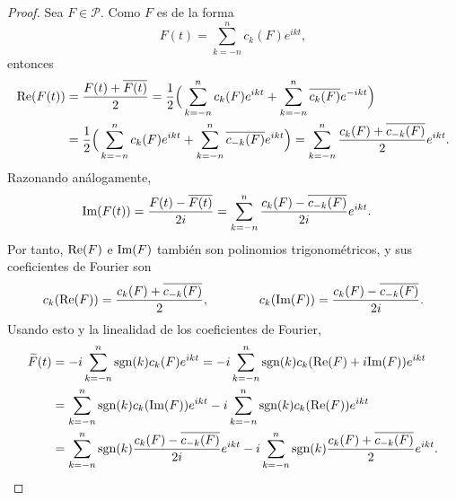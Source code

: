 \documentclass[a4paper, 12pt, oneside]{book}
\begin{document}
\begin{proof}
    Sea $F \in \mathcal{P}$. Como $F$ es de la forma
    \[F(t) = \sum_{k=-n}^n c_k(F)e^{ikt},\]
    entonces
    \begin{align*}
        \textup{Re}(F(t)) &= \frac{F(t)+\overline{F(t)}}{2} = \frac{1}{2}\Bigl(\,\sum_{k=-n}^n c_k(F)e^{ikt}+\sum_{k=-n}^n\overline{c_k(F)}e^{-ikt}\Bigr) \\
        &= \frac{1}{2}\Bigl(\,\sum_{k=-n}^n c_k(F)e^{ikt}+\sum_{k=-n}^n\overline{c_{-k}(F)}e^{ikt}\Bigr) = \sum_{k=-n}^n \frac{c_k(F)+\overline{c_{-k}(F)}}{2}e^{ikt}.
    \end{align*}
    Razonando análogamente,
    \begin{align*}
        \textup{Im}(F(t)) &= \frac{F(t)-\overline{F(t)}}{2i} = \sum_{k=-n}^n \frac{c_k(F)-\overline{c_{-k}(F)}}{2i}e^{ikt}.
    \end{align*}
    Por tanto, $\textup{Re}(F)$ e $\textup{Im}(F)$ también son polinomios trigonométricos, y sus coeficientes de Fourier son
    \[c_k(\textup{Re}(F)) = \frac{c_k(F)+\overline{c_{-k}(F)}}{2}, \qquad \qquad c_k(\textup{Im}(F)) = \frac{c_k(F)-\overline{c_{-k}(F)}}{2i}.\]
    Usando esto y la linealidad de los coeficientes de Fourier,
    \begin{equation}\label{3.3.2}
    \begin{aligned}[b]
        \widetilde{F}(t) &= -i\sum_{k=-n}^n \textup{sgn}(k)c_k(F)e^{ikt} = -i\sum_{k=-n}^n \textup{sgn}(k)c_k(\textup{Re}(F)+i\textup{Im}(F))e^{ikt} \\
        &= \sum_{k=-n}^n \textup{sgn}(k)c_k(\textup{Im}(F))e^{ikt} -i\sum_{k=-n}^n \textup{sgn}(k)c_k(\textup{Re}(F))e^{ikt} \\
        &=  \sum_{k=-n}^n \textup{sgn}(k)\frac{c_k(F)-\overline{c_{-k}(F)}}{2i}e^{ikt} -i\sum_{k=-n}^n \textup{sgn}(k)\frac{c_k(F)+\overline{c_{-k}(F)}}{2}e^{ikt}.
     \end{aligned}
    \end{equation}
    

\end{proof}
\end{document}
